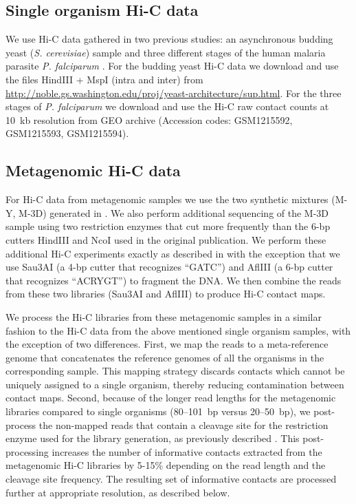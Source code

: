\subsection{Single organism Hi-C data}
We use Hi-C data gathered in two previous studies: an asynchronous budding yeast
(\textit{S. cerevisiae}) sample \citep{duan:three} and three different stages of
the human malaria parasite \textit{P. falciparum} \citep{ay:three-dimensional}.
For the budding yeast Hi-C data we download and use the files HindIII + MspI
(intra and inter)
from \url{http://noble.gs.washington.edu/proj/yeast-architecture/sup.html}.
For the three stages of \textit{P. falciparum} we download and use the Hi-C raw contact counts
at 10~kb resolution from GEO archive (Accession codes: GSM1215592, GSM1215593, GSM1215594).

\subsection{Metagenomic Hi-C data}
For Hi-C data from metagenomic samples we use the two synthetic mixtures (M-Y, M-3D)
generated in \citep{burton:species-level}. We also perform additional
sequencing of the M-3D sample using two restriction enzymes that cut more frequently than
the 6-bp cutters HindIII and NcoI used in the original publication. We perform these
additional Hi-C experiments exactly as described in \citep{burton:species-level}
with the exception that we use Sau3AI (a 4-bp cutter that recognizes ``GATC'') and AflIII
(a 6-bp cutter that recognizes ``ACRYGT'') to fragment the DNA. We then combine the reads
from these two libraries (Sau3AI and AflIII) to produce
Hi-C contact maps.

We process the Hi-C libraries from these metagenomic samples in a
similar fashion to the 
Hi-C data from the above mentioned single organism samples, with the exception of two differences.
First, we map the reads to a meta-reference genome that concatenates the reference genomes
of all the organisms in the corresponding sample. This mapping strategy discards contacts
which cannot be uniquely assigned to a single organism, thereby reducing contamination
between contact maps. Second, because of the longer read lengths
for the metagenomic libraries compared to single organisms (80--101~bp versus 20--50~bp), we
post-process the non-mapped reads that contain a cleavage site for the restriction enzyme
used for the library generation, as previously described \citep{ay:identifying}. This post-processing
increases the number of informative contacts extracted from the metagenomic Hi-C libraries by
5-15\% depending on the read length and the cleavage site frequency. The resulting set of
informative contacts are processed further at appropriate resolution, as described below.

